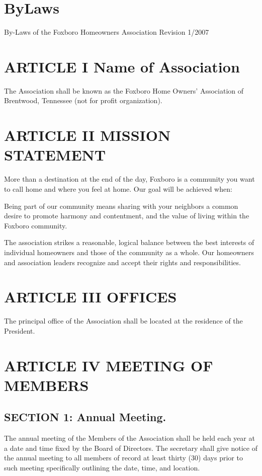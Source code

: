 \section{ByLaws}
By-Laws of the Foxboro Homeowners Association
Revision 1/2007


\section{ARTICLE I Name of Association}

The Association shall be known as the Foxboro Home Owners’ Association of Brentwood, Tennessee (not for profit organization).

\section{ARTICLE II MISSION STATEMENT}

More than a destination at the end of the day, Foxboro is a community
you want to call home and where you feel at home. Our goal will be
achieved when:

Being part of our community means sharing with your neighbors a common
desire to promote harmony and contentment, and the value of living within
the Foxboro community.

The association strikes a reasonable, logical balance between the best
interests of individual homeowners and those of the community as a whole.
Our homeowners and association leaders recognize and accept their rights
and responsibilities.

\section{ARTICLE III OFFICES}

The principal office of the Association shall be located at the residence
of the President.

\section{ARTICLE IV MEETING OF MEMBERS}

\subsection{SECTION 1: Annual Meeting.}

The annual meeting of the Members of the Association shall be held each
year at a date and time fixed by the Board of Directors. The secretary
shall give notice of the annual meeting to all members of record at least
thirty (30) days prior to such meeting specifically outlining the date,
time, and location.

